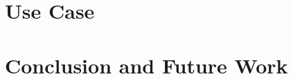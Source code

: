 \documentclass[10pt, conference, compsocconf]{IEEEtran}
\begin{document}
\section{Use Case}
%
\section{Conclusion and Future Work}
% 
%
%
%

\end{document}
